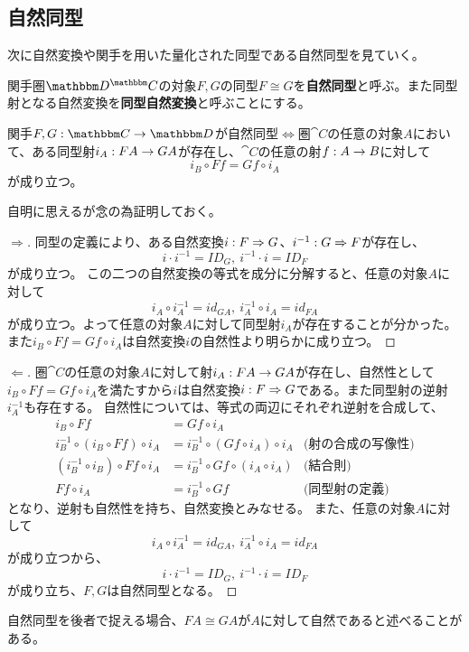 	\subsection{自然同型}
  次に自然変換や関手を用いた量化された同型である自然同型を見ていく。
  \begin{define}
    関手圏$\funccat{C}{D}$の対象$F,G$の同型$F\cong G$を\textbf{自然同型}と呼ぶ。また同型射となる自然変換を\textbf{同型自然変換}と呼ぶことにする。
  \end{define}
  \begin{prop}[自然同型と対象の同型]
    関手$\functor{F,G}{C}{D}$が自然同型$\iff$圏$\cat{C}$の任意の対象$A$において、ある同型射$i_A:FA\rightarrow GA$が存在し、$\cat{C}$の任意の射$f:A\rightarrow B$に対して\[i_B\circ Ff=Gf\circ i_A\]が成り立つ。
  \end{prop}
  自明に思えるが念の為証明しておく。
  \begin{proof}[$\Longrightarrow$]
    同型の定義により、ある自然変換$i:F\Rightarrow G$、$i^{-1}:G\Rightarrow F$が存在し、\[i\cdot i^{-1}=ID_G,\ i^{-1}\cdot i=ID_F\]が成り立つ。
    この二つの自然変換の等式を成分に分解すると、任意の対象$A$に対して\[i_A\circ i^{-1}_A=id_{GA},\ i^{-1}_A\circ i_A=id_{FA}\]が成り立つ。よって任意の対象$A$に対して同型射$i_A$が存在することが分かった。
    また$i_B\circ Ff=Gf\circ i_A$は自然変換$i$の自然性より明らかに成り立つ。
  \end{proof}
  \begin{proof}[$\Longleftarrow$]
    圏$\cat{C}$の任意の対象$A$に対して射$i_A:FA\rightarrow GA$が存在し、自然性として$i_B\circ Ff=Gf\circ i_A$を満たすから$i$は自然変換$i:F\Rightarrow G$である。また同型射の逆射$i^{-1}_A$も存在する。
    自然性については、等式の両辺にそれぞれ逆射を合成して、
    \begin{align*}
      i_B\circ Ff &=Gf\circ i_A\\
      i^{-1}_B\circ (i_B\circ Ff)\circ i_A &=i^{-1}_B\circ(Gf\circ i_A)\circ i_A&\text{(射の合成の写像性)}\\
      (i^{-1}_B\circ i_B)\circ Ff\circ i_A &=i^{-1}_B\circ Gf\circ (i_A\circ i_A)&\text{(結合則)}\\
      Ff\circ i_A&=i^{-1}_B\circ Gf&\text{(同型射の定義)}
    \end{align*}
    となり、逆射も自然性を持ち、自然変換とみなせる。
    また、任意の対象$A$に対して\[i_A\circ i^{-1}_A=id_{GA},\ i^{-1}_A\circ i_A=id_{FA}\]が成り立つから、\[i\cdot i^{-1}=ID_G,\ i^{-1}\cdot i=ID_F\]が成り立ち、$F,G$は自然同型となる。
  \end{proof}
  自然同型を後者で捉える場合、$FA\cong GA$が$A$に対して自然であると述べることがある。

